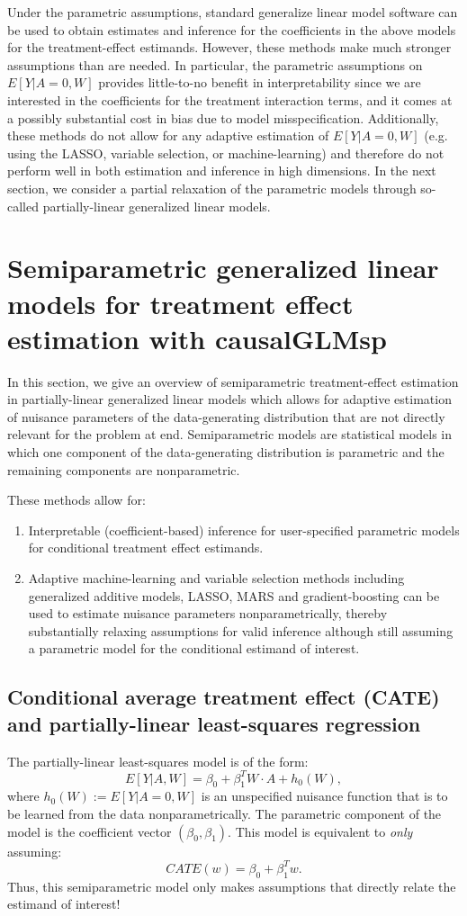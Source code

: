 \documentclass{article}
\begin{document}
Under the parametric assumptions, standard generalize linear model software can be used to obtain estimates and inference for the coefficients in the above models for the treatment-effect estimands. However, these methods make much stronger assumptions than are needed. In particular, the parametric assumptions on $E[Y|A=0,W]$ provides little-to-no benefit in interpretability since we are interested in the coefficients for the treatment interaction terms, and it comes at a possibly substantial cost in bias due to model misspecification. Additionally, these methods do not allow for any adaptive estimation of $E[Y|A=0,W]$ (e.g. using the LASSO, variable selection, or machine-learning) and therefore do not perform well in both estimation and inference in high dimensions. In the next section, we consider a partial relaxation of the parametric models through so-called partially-linear generalized linear models.




\section{Semiparametric generalized linear models for treatment effect estimation  with causalGLMsp}

In this section, we give an overview of semiparametric treatment-effect estimation in partially-linear generalized linear models which allows for adaptive estimation of nuisance parameters of the data-generating distribution that are not directly relevant for the problem at end. Semiparametric models are statistical models in which one component of the data-generating distribution is parametric and the remaining components are nonparametric. 

 

These methods allow for:
\begin{enumerate}
    \item Interpretable (coefficient-based) inference for user-specified parametric models for conditional treatment effect estimands.
    \item Adaptive machine-learning and variable selection methods including generalized additive models, LASSO, MARS and gradient-boosting can be used to estimate nuisance parameters nonparametrically, thereby substantially relaxing assumptions for valid inference although still assuming a parametric model for the conditional estimand of interest.
\end{enumerate}

\subsection{Conditional average treatment effect (CATE) and partially-linear least-squares regression}
The partially-linear least-squares model is of the form:
$$E[Y|A,W] = \beta_0 + \beta_1^T W \cdot A + h_0(W),$$
where $ h_0(W) := E[Y|A=0,W]$ is an unspecified nuisance function that is to be learned from the data nonparametrically. The parametric component of the model is the coefficient vector $(\beta_0, \beta_1)$. This model is equivalent to \textit{only} assuming:
$$CATE(w) = \beta_0 + \beta_1^T w.$$
Thus, this semiparametric model only makes assumptions that directly relate the estimand of interest!
\end{document}
